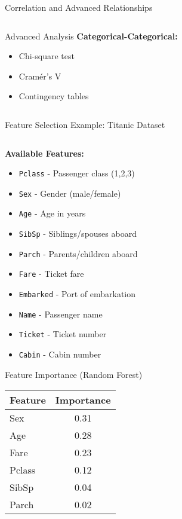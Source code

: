 \documentclass[8pt,aspectratio=1610]{beamer}
\begin{document}
\begin{frame}{Correlation and Advanced Relationships}
\begin{columns}[t]
\begin{column}{0.48\textwidth}
\begin{block}{Advanced Analysis}
\textbf{Categorical-Categorical:}
\begin{itemize}
\setlength{\itemsep}{1pt}
\item Chi-square test
\item Cramér's V
\item Contingency tables
\end{itemize}
\end{block}
\end{column}
\end{columns}
\end{frame}

\begin{frame}{Feature Selection Example: Titanic Dataset}
\begin{columns}[t]
\begin{column}{0.48\textwidth}
\textbf{Available Features:}
\begin{itemize}
\setlength{\itemsep}{1pt}
\item \texttt{Pclass} - Passenger class (1,2,3)
\item \texttt{Sex} - Gender (male/female)
\item \texttt{Age} - Age in years
\item \texttt{SibSp} - Siblings/spouses aboard
\item \texttt{Parch} - Parents/children aboard
\item \texttt{Fare} - Ticket fare
\item \texttt{Embarked} - Port of embarkation
\item \texttt{Name} - Passenger name
\item \texttt{Ticket} - Ticket number
\item \texttt{Cabin} - Cabin number
\end{itemize}

\vspace{0.3cm}
\begin{block}{Feature Importance (Random Forest)}
\scriptsize
\begin{tabular}{|l|c|}
\hline
\textbf{Feature} & \textbf{Importance} \\
\hline
Sex & 0.31 \\
Age & 0.28 \\
Fare & 0.23 \\
Pclass & 0.12 \\
SibSp & 0.04 \\
Parch & 0.02 \\
\hline
\end{tabular}
\end{block}
\end{column}


\end{columns}
\end{frame}
\end{document}
